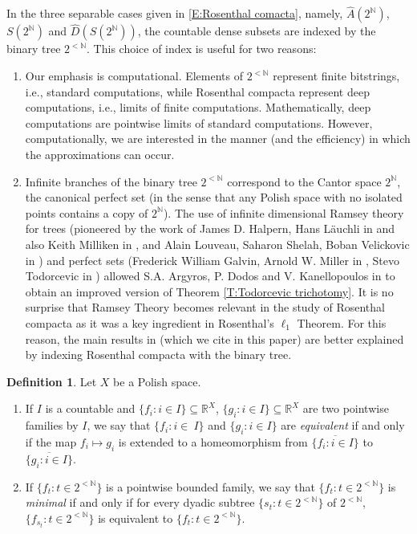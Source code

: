 \documentclass[psamsfonts]{amsart}
\theoremstyle{definition}
\newtheorem{defn}[thm]{Definition}
\theoremstyle{remark}
\numberwithin{equation}{section}
\begin{document}
In the three separable cases given in \ref{E:Rosenthal comacta}, namely, $\hat{A}(2^\mathbb{N})$, $S(2^\mathbb{N})$ and $\hat{D}(S(2^\mathbb{N}))$, the countable dense subsets are indexed by the binary tree $2^{<\mathbb{N}}$.
This choice of index is useful for two reasons:
\begin{enumerate}
\item
Our emphasis is computational.
Elements of $2^{<\mathbb{N}}$ represent finite bitstrings, i.e.,  standard computations, while Rosenthal compacta represent deep computations, i.e., limits of finite computations.
Mathematically, deep computations are pointwise limits of standard computations.
However, computationally, we are interested in the manner (and the efficiency) in which the approximations can occur.
\item
Infinite branches of the binary tree $2^{<\mathbb{N}}$ correspond to the Cantor space $2^{\mathbb{N}}$, the canonical perfect set (in the sense that  any Polish space with no isolated points contains a copy of $2^{\mathbb{N}}$). 
The use of infinite dimensional Ramsey theory for trees (pioneered by the work of James D. Halpern, Hans L\" auchli in \cite{halpern1966partition} and also Keith Milliken in \cite{milliken1981partition}, and Alain Louveau, Saharon Shelah, Boban Velickovic in \cite{louveau_shelah_velickovic_1993}) and perfect sets (Frederick William Galvin, Arnold W. Miller in \cite{miller1989infinite}, Stevo Todorcevic in \cite{Todorcevic_1999_CompactSubsetsBaire}) allowed S.A. Argyros, P. Dodos and V. Kanellopoulos in \cite{argyros2008rosenthal} to obtain an improved version of Theorem \ref{T:Todorcevic trichotomy}.
It is no surprise that Ramsey Theory becomes relevant in the study of Rosenthal compacta as it was a key ingredient in Rosenthal's $\ell_1$ Theorem.
For this reason, the main results in \cite{argyros2008rosenthal} (which we cite in this paper) are better explained by indexing Rosenthal compacta with the binary tree.
\end{enumerate}

\begin{defn}
Let $X$ be a Polish space.

\begin{enumerate}
\item
If  $I$ is a countable and $\{f_i:i\in I\}\subseteq\mathbb{R}^X$, $\{g_i:i\in I\}\subseteq\mathbb{R}^X$  are two pointwise families by  $I$, we say that $\{f_i:i\in\ I\}$ and $\{g_i:i\in I\}$ are \emph{equivalent} if and only if the map $f_i\mapsto g_i$ is extended to a homeomorphism from $\overline{\{f_i:i\in I\}}$ to $\overline{\{g_i:i\in I\}}$.
\item
If $\{f_t:t\in 2^{<\mathbb{N}}\}$ is a pointwise bounded family, we say that $\{f_t:t\in 2^{<\mathbb{N}}\}$ is \emph{minimal} if and only if for every dyadic subtree $\{s_t:t\in 2^{<\mathbb{N}}\}$ of $2^{<\mathbb{N}}$, $\{f_{s_t}:t\in 2^{<\mathbb{N}}\}$ is equivalent to $\{f_t:t\in 2^{<\mathbb{N}}\}$.
 \end{enumerate}
\end{defn}
\end{document}
